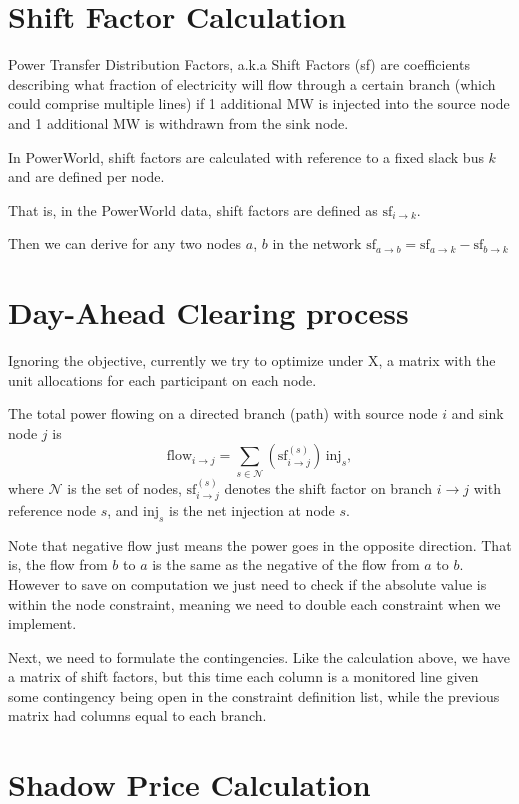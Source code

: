 \documentclass[11pt]{article}
\begin{document}
\section{Shift Factor Calculation}
Power Transfer Distribution Factors, a.k.a Shift Factors (sf) are coefficients describing what fraction of electricity will flow through a certain branch (which could comprise multiple lines) if 1 additional MW is injected into the source node and 1 additional MW is withdrawn from the sink node.

In PowerWorld, shift factors are calculated with reference to a fixed slack bus $k$ and are defined per node. 

That is, in the PowerWorld data, shift factors are defined as $\text{sf}_{i \rightarrow k}$. 

Then we can derive for any two nodes $a$, $b$ in the network $\text{sf}_{a \rightarrow b} = \text{sf}_{a \rightarrow k} - \text{sf}_{b \rightarrow k}$

\section{Day-Ahead Clearing process}

Ignoring the objective, currently we try to optimize under X, a matrix with the unit allocations for each participant on each node.

The total power flowing on a directed branch (path) with source node $i$ and sink node $j$ is
\[
  \mathrm{flow}_{i\rightarrow j}
  = \sum_{s\in\mathcal{N}} \left(\mathrm{sf}^{(s)}_{i\rightarrow j}\right)\,\mathrm{inj}_s,
\]
where $\mathcal{N}$ is the set of nodes, $\mathrm{sf}^{(s)}_{i\rightarrow j}$ denotes the shift factor on branch $i\to j$ with reference node $s$, and $\mathrm{inj}_s$ is the net injection at node $s$.

Note that negative flow just means the power goes in the opposite direction. That is, the flow from $b$ to $a$ is the same as the negative of the flow from $a$ to $b$. However to save on computation we just need to check if the absolute value is within the node constraint, meaning we need to double each constraint when we implement.

Next, we need to formulate the contingencies. Like the calculation above, we have a matrix of shift factors, but this time each column is a monitored line given some contingency being open in the constraint definition list, while the previous matrix had columns equal to each branch.

\section{Shadow Price Calculation}
\end{document}
